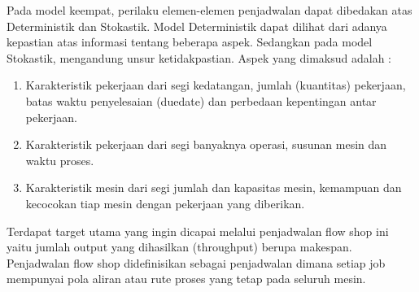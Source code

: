 \documentclass[a4paper,twoside]{article}
\begin{document}
\begin{enumerate}
\begin{itemize}
		 Pada model keempat, perilaku elemen-elemen penjadwalan dapat dibedakan atas Deterministik dan Stokastik. Model Deterministik dapat dilihat dari adanya kepastian atas informasi tentang beberapa aspek. Sedangkan pada model Stokastik, mengandung unsur ketidakpastian. Aspek yang dimaksud adalah :
		 \begin{enumerate}
		 	\item Karakteristik pekerjaan dari segi kedatangan, jumlah (kuantitas) pekerjaan, batas waktu penyelesaian (duedate) dan perbedaan kepentingan antar pekerjaan.
		 	\item Karakteristik pekerjaan dari segi banyaknya operasi, susunan mesin dan waktu proses.
		 	\item Karakteristik mesin dari segi jumlah dan kapasitas mesin, kemampuan dan kecocokan tiap mesin dengan pekerjaan yang diberikan. 
		 \end{enumerate}
		Terdapat target utama yang ingin dicapai melalui penjadwalan flow shop ini yaitu jumlah output yang dihasilkan (throughput) berupa makespan. Penjadwalan flow shop didefinisikan sebagai penjadwalan dimana setiap job mempunyai pola aliran atau rute proses yang tetap pada seluruh mesin.
		\end{itemize}	
	

\end{enumerate}
\end{document}
